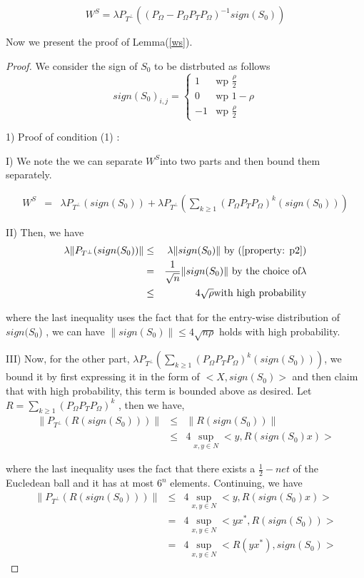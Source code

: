 \[
W^{S}=\lambda P_{T^{\bot}}((P_{\Omega}-P_{\Omega}P_{T}P_{\Omega})^{-1}sign(S_{0}))
\]

Now we present the proof of Lemma(\ref{ws}). 
\begin{proof}
We consider the sign of $S_{0}$ to be distrbuted as follows
\[
sign(S_{0})_{i,j}=\begin{cases}
1 & \text{wp }\frac{\rho}{2}\\
0 & \text{wp }1-\rho\\
-1 & \text{wp }\frac{\rho}{2}
\end{cases}
\]


1) Proof of condition (1) :

I) We note the we can separate $W^{S}$into two parts and then bound them separately.

\begin{eqnarray*}
W^{S} & = & \lambda P_{T^{\bot}}(sign(S_{0}))+\lambda P_{T^{\bot}}(\sum_{k\ge1}(P_{\Omega}P_{T}P_{\Omega})^{k}(sign(S_{0})))
\end{eqnarray*}


II) Then, we have
\begin{eqnarray*}
\lambda \| P_{T^{\bot}}(sign(S_{0})) \| & \le & \lambda\|sign(S_{0})\| \text{ by (\ref{property: p2})}\\
 & = & \frac{1}{\sqrt{n}}\|sign(S_{0})\| \text{ by the choice of}  \lambda\\
 & \le & 4\sqrt{\rho}\text{with high probability}
\end{eqnarray*}


where the last inequality uses the fact that for the entry-wise distribution of $sign(S_{0}$) , we can have $\|sign(S_{0})\|\le4\sqrt{n\rho}$ holds with high probability.

III) Now, for the other part, $\lambda P_{T^{\bot}}(\sum_{k\ge1}(P_{\Omega}P_{T}P_{\Omega})^{k}(sign(S_{0})))$, we bound it by first expressing it in the form of $<X,sign(S_{0})>$ and then claim that with high probability, this term is bounded above as desired. Let $R=\sum_{k\ge1}(P_{\Omega}P_{T}P_{\Omega})^{k}$ ,
then we have,
\begin{eqnarray*}
\|P_{T^{\bot}}(R(sign(S_{0})))\| & \le & \|R(sign(S_{0}))\|\\
 & \le & 4\sup_{x,y\in N}<y,R(sign(S_{0})x)>
\end{eqnarray*}


where the last inequality uses the fact that there exists a $\frac{1}{2}-net$ of the Eucledean ball and it has at most $6^{n}$ elements. Continuing, we have
\begin{eqnarray} 
\|P_{T^{\bot}}(R(sign(S_{0})))\| & \le & 4\sup_{x,y\in N}<y,R(sign(S_{0})x)>\\
 & = & 4\sup_{x,y\in N}<yx^{*},R(sign(S_{0}))>\\
 & = & 4\sup_{x,y\in N}<R(yx^{*}),sign(S_{0})>\label{net}
\end{eqnarray}



\end{proof}
